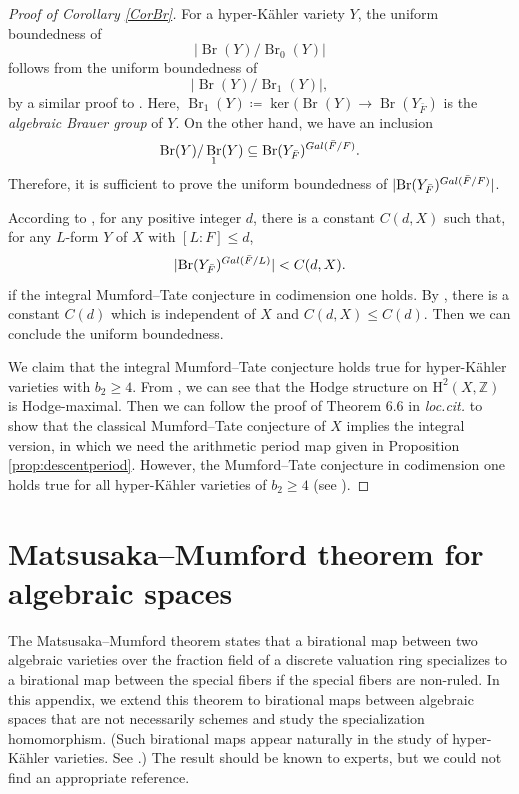 \documentclass[11pt,reqno,oneside]{amsart}
\numberwithin{equation}{section}
\theoremstyle{definition}
\DeclareMathOperator{\Br}{Br}
\newcommand{\Gal}{{\rm Gal}}
\newcommand\rH{\mathrm{H}}
\newcommand{\ZZ}{\mathbb{Z}}
\begin{document}
\begin{proof}[Proof of Corollary \ref{CorBr}]

For a hyper-Kähler variety $Y$, the uniform boundedness of \[ \lvert \Br(Y)/\Br_0(Y) \vert\] follows from the uniform boundedness of \[\lvert \Br(Y)/\Br_1(Y) \rvert,\]
by a similar proof to \cite[Proposition 6.3]{VV17}. Here, $\Br_1(Y) \coloneqq \ker(\Br(Y) \to \Br(Y_{\bar{F}})$ is the \emph{algebraic Brauer group} of $Y$. On the other hand, we have an inclusion
\[
\Br(Y)/\Br_1(Y) \subseteq \Br(Y_{\bar{F}})^{\Gal(\bar{F}/F)}.
\]
Therefore, it is sufficient to prove the uniform boundedness of $\lvert \Br(Y_{\bar{F}})^{\Gal(\bar{F}/F)} \rvert$.

According to \cite[Theorem 5.1]{OrrSkorobogatov},  for any positive integer $d$, there is a constant $C(d,X)$ such that, for any $L$-form $Y$ of $X$ with $[L:F] \leq d$, 
\[ 
\lvert \Br(Y_{\bar{F}})^{\Gal(\bar{F}/L)} \rvert < C(d,X).
\]
if the integral Mumford--Tate conjecture in codimension one holds. By , there is a constant $C(d)$ which is independent of $X$ and $C(d,X) \leq  C(d)$. Then we can conclude the uniform boundedness.

We claim that the integral Mumford--Tate conjecture holds true for hyper-Kähler varieties with $b_2 \geq 4$. From \cite[Proposition 6.2]{CadoretMoonen}, we can see that the Hodge structure on $\rH^2(X,\ZZ)$ is Hodge-maximal. Then we can follow the proof of Theorem 6.6 in {\it loc.cit.} to show that the classical Mumford--Tate conjecture of $X$ implies the integral version, in which we need the arithmetic period map given in Proposition \ref{prop:descentperiod}. However, the Mumford--Tate conjecture in codimension one holds true for all hyper-Kähler varieties of $b_2 \geq 4$ (see \cite[Corollary 1.5.2]{A96}).
\end{proof}


\appendix

\section{Matsusaka--Mumford theorem for algebraic spaces}
\label{appendixMatsusakaMumford}
The Matsusaka--Mumford theorem \cite{MM64}
states that a birational map between two algebraic varieties
over the fraction field of a discrete valuation ring
specializes to a birational map between the special fibers
if the special fibers are non-ruled.
In this appendix, we extend this theorem to
birational maps between algebraic spaces that are not necessarily schemes and study the specialization homomorphism. 
(Such birational maps appear naturally in the study of
hyper-Kähler varieties. See \cite[Section 4.4]{LM18}.)
The result should be known to experts, but we could not find an appropriate reference. 
\end{document}
